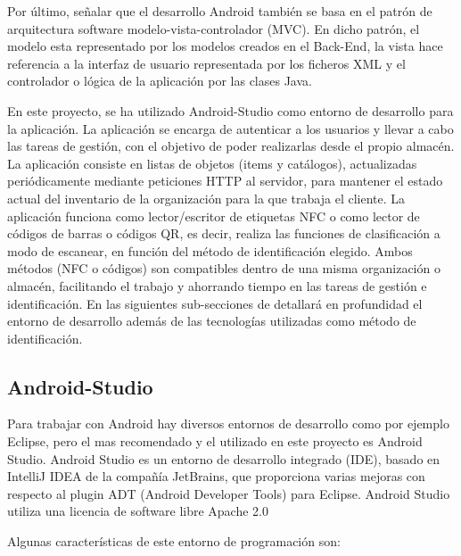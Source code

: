 \documentclass[a4paper,11pt]{book}
\begin{document}
Por último, señalar que el desarrollo Android también se basa en el patrón de arquitectura software modelo-vista-controlador (MVC). En dicho patrón, el modelo esta representado por los modelos creados en el Back-End, la vista hace referencia a la interfaz de usuario representada por los ficheros XML y el controlador o lógica de la aplicación por las clases Java. 


En este proyecto, se ha utilizado Android-Studio como entorno de desarrollo para la aplicación. La aplicación se encarga de autenticar a los usuarios y llevar a cabo las tareas de gestión, con el objetivo de poder realizarlas desde el propio almacén. La aplicación consiste en listas de  objetos (items y catálogos), actualizadas periódicamente mediante peticiones HTTP al servidor, para mantener el estado actual del inventario de la organización para la que trabaja el cliente. La aplicación funciona como lector/escritor de etiquetas NFC o como lector de códigos de barras o códigos QR, es decir, realiza las funciones de clasificación a modo de escanear, en función del método de identificación elegido. Ambos métodos (NFC o códigos) son compatibles dentro de una misma organización o almacén, facilitando el trabajo y ahorrando tiempo en las tareas de gestión e identificación. En las siguientes sub-secciones de detallará en profundidad el entorno de desarrollo además de las tecnologías utilizadas como método de identificación. 
 
  

\subsection{Android-Studio}

Para trabajar con Android hay diversos entornos de desarrollo como por ejemplo Eclipse, pero el mas recomendado y el utilizado en este proyecto es Android Studio\cite{as}. Android Studio es un entorno de desarrollo integrado (IDE), basado en IntelliJ IDEA de la compañía JetBrains,  que proporciona varias mejoras con respecto al plugin ADT (Android Developer Tools) para Eclipse. Android Studio utiliza una licencia de software libre Apache 2.0




Algunas características\cite{as2} de este entorno de programación son:
\end{document}
